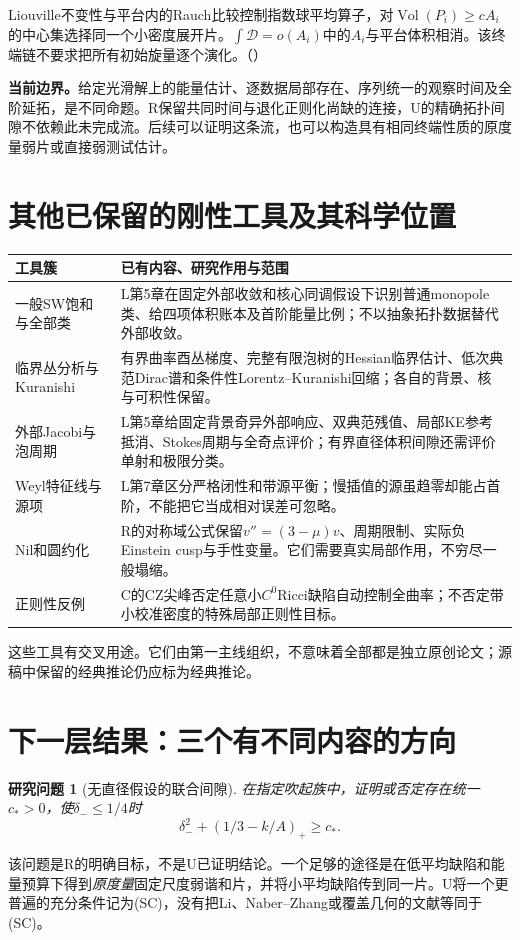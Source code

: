 \documentclass[UTF8,fontset=fandol,zihao=-4]{ctexart}
\theoremstyle{research}
\newtheorem{problem}[result]{研究问题}
\DeclareMathOperator{\Vol}{Vol}
\newcommand{\Dcal}{\mathcal D}
\numberwithin{equation}{section}
\begin{document}
Liouville不变性与平台内的Rauch比较控制指数球平均算子，对$\Vol(P_i)\ge cA_i$的中心集选择同一个小密度展开片。$\int\Dcal=o(A_i)$中的$A_i$与平台体积相消。该终端链不要求把所有初始旋量逐个演化。\cite{R}（）

\textbf{当前边界。}给定光滑解上的能量估计、逐数据局部存在、序列统一的观察时间及全阶延拓，是不同命题。R保留共同时间与退化正则化尚缺的连接，U的精确拓扑间隙不依赖此未完成流。后续可以证明这条流，也可以构造具有相同终端性质的原度量弱片或直接弱测试估计。

\section{其他已保留的刚性工具及其科学位置}
\begin{longtable}{P{.25\textwidth}P{.67\textwidth}}
\toprule 工具簇 & 已有内容、研究作用与范围\\\midrule\endhead
一般SW饱和与全部类 & L第5章在固定外部收敛和核心同调假设下识别普通monopole类、给四项体积账本及首阶能量比例；不以抽象拓扑数据替代外部收敛。\\
临界丛分析与Kuranishi & 有界曲率酉丛梯度、完整有限泡树的Hessian临界估计、低次典范Dirac谱和条件性Lorentz--Kuranishi回缩；各自的背景、核与可积性保留。\\
外部Jacobi与泡周期 & L第5章给固定背景奇异外部响应、双典范残值、局部KE参考抵消、Stokes周期与全奇点评价；有界直径体积间隙还需评价单射和极限分类。\\
Weyl特征线与源项 & L第7章区分严格闭性和带源平衡；慢插值的源虽趋零却能占首阶，不能把它当成相对误差可忽略。\\
Nil和圆约化 & R的对称域公式保留$v''=(3-\mu)v$、周期限制、实际负Einstein cusp与手性变量。它们需要真实局部作用，不穷尽一般塌缩。\\
正则性反例 & C的CZ尖峰否定任意小$C^0$Ricci缺陷自动控制全曲率；不否定带小校准密度的特殊局部正则性目标。\\\bottomrule
\end{longtable}
这些工具有交叉用途。它们由第一主线组织，不意味着全部都是独立原创论文；源稿中保留的经典推论仍应标为经典推论。\cite{Map,L,R,C}

\section{下一层结果：三个有不同内容的方向}
\begin{problem}[无直径假设的联合间隙]
在指定吹起族中，证明或否定存在统一$c_*>0$，使$\delta_-\le1/4$时
\[
\delta_-^2+(1/3-k/A)_+\ge c_*.
\]
\end{problem}
该问题是R的明确目标，不是U已证明结论。一个足够的途径是在低平均缺陷和能量预算下得到\emph{原度量}固定尺度弱谐和片，并将小平均缺陷传到同一片。U将一个更普遍的充分条件记为(SC)，没有把Li、Naber--Zhang或覆盖几何的文献等同于(SC)。
\end{document}

